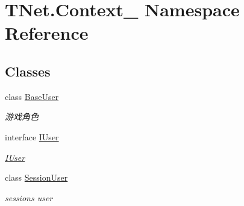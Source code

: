 \hypertarget{namespace_t_net_1_1_context__}{}\section{T\+Net.\+Context\+\_\+ Namespace Reference}
\label{namespace_t_net_1_1_context__}
\subsection*{Classes}
\begin{DoxyCompactItemize}
\item 
class \mbox{\hyperlink{class_t_net_1_1_context___1_1_base_user}{Base\+User}}
\begin{DoxyCompactList}\small\item\em 游戏角色 \end{DoxyCompactList}\item 
interface \mbox{\hyperlink{interface_t_net_1_1_context___1_1_i_user}{I\+User}}
\begin{DoxyCompactList}\small\item\em \mbox{\hyperlink{interface_t_net_1_1_context___1_1_i_user}{I\+User}} \end{DoxyCompactList}\item 
class \mbox{\hyperlink{class_t_net_1_1_context___1_1_session_user}{Session\+User}}
\begin{DoxyCompactList}\small\item\em session\textquotesingle{}s user \end{DoxyCompactList}\end{DoxyCompactItemize}
